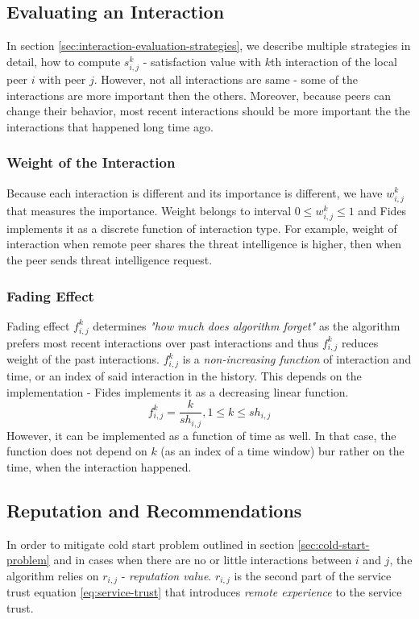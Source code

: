 \subsection{Evaluating an Interaction}
\label{subsec:evaluating-an-interaction}
In section \ref{sec:interaction-evaluation-strategies}, we describe multiple strategies in detail, how to compute $s^{k}_{i,j}$ - satisfaction value with $k$th interaction of the local peer $i$ with peer $j$.
However, not all interactions are same - some of the interactions are more important then the others. 
Moreover, because peers can change their behavior, most recent interactions should be more important the the interactions that happened long time ago.

\subsubsection{Weight of the Interaction}
Because each interaction is different and its importance is different, we have $w^{k}_{i,j}$ that measures the importance.
Weight belongs to interval $0 \leq w^{k}_{i,j} \leq 1$ and Fides implements it as a discrete function of interaction type. 
For example, weight of interaction when remote peer shares the threat intelligence is higher, then when the peer sends threat intelligence request.


\subsubsection{Fading Effect}
Fading effect $f^{k}_{i,j}$ determines \textit{"how much does algorithm forget"} as the algorithm prefers most recent interactions over past interactions and thus $f^{k}_{i,j}$ reduces weight of the past interactions. 
$f^{k}_{i,j}$ is a \textit{non-increasing function} of interaction and time, or an index of said interaction in the history.
This depends on the implementation - Fides implements it as a decreasing linear function.
\begin{equation}
    f^{k}_{i,j} = \frac{k}{sh_{i,j}}, 1 \leq k \leq sh_{i,j}
\end{equation}
However, it can be implemented as a function of time as well. In that case, the function does not depend on $k$ (as an index of a time window) bur rather on the time, when the interaction happened.

\subsection{Reputation and Recommendations}
In order to mitigate cold start problem outlined in section \ref{sec:cold-start-problem} and in cases when there are no or little interactions between $i$ and $j$, the algorithm relies on $r_{i,j}$ - \textit{reputation value}. 
$r_{i,j}$ is the second part of the service trust equation \ref{eq:service-trust} that introduces \textit{remote experience} to the service trust.

